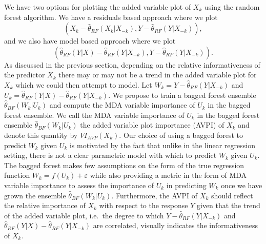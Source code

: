 \documentclass[12pt,twoside]{reedthesis}
\theoremstyle{definition}
\theoremstyle{definition}
\theoremstyle{definition}
\theoremstyle{remark}
\begin{document}
We have two options for plotting the added variable plot of \(X_k\)
using the random forest algorithm. We have a residuals based approach
where we plot
\[(X_k-\hat{\theta}_{RF}(X_k|X_{-k}),Y-\hat{\theta}_{RF}(Y|X_{-k})),\]
and we also have model based approach where we plot
\[(\hat{\theta}_{RF}(Y|X)-\hat{\theta}_{RF}(Y|X_{-k}), Y-\hat{\theta}_{RF}(Y|X_{-k})).\]
As discussed in the previous section, depending on the relative
informativeness of the predictor \(X_k\) there may or may not be a trend
in the added variable plot for \(X_k\) which we could then attempt to
model. Let \(W_k=Y-\hat{\theta}_{RF}(Y|X_{-k})\) and
\(U_k=\hat{\theta}_{RF}(Y|X)-\hat{\theta}_{RF}(Y|X_{-k})\). We propose
to train a bagged forest ensemble \(\hat{\theta}_{BF}(W_k|U_k)\) and
compute the MDA variable importance of \(U_k\) in the bagged forest
ensemble. We call the MDA variable importance of \(U_k\) in the bagged
forest ensemble \(\hat{\theta}_{BF}(W_k|U_k)\) the added variable plot
importance (AVPI) of \(X_k\) and denote this quantity by
\(VI_{AVP}(X_k)\). Our choice of using a bagged forest to predict
\(W_k\) given \(U_k\) is motivated by the fact that unlike in the linear
regression setting, there is not a clear parametric model with which to
predict \(W_k\) given \(U_k\). The bagged forest makes few assumptions
on the form of the true regression function \(W_k=f(U_k)+\varepsilon\)
while also providing a metric in the form of MDA variable importance to
assess the importance of \(U_k\) in predicting \(W_k\) once we have
grown the ensemble \(\hat{\theta}_{BF}(W_k|U_k)\). Furthermore, the AVPI
of \(X_k\) should reflect the relative importance of \(X_k\) with
respect to the response \(Y\) given that the trend of the added variable
plot, i.e.~the degree to which \(Y-\hat{\theta}_{RF}(Y|X_{-k})\) and
\(\hat{\theta}_{RF}(Y|X)-\hat{\theta}_{RF}(Y|X_{-k})\) are correlated,
visually indicates the informativeness of \(X_k\).
\end{document}

